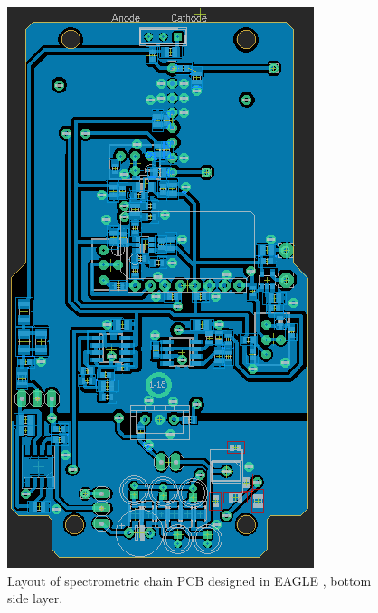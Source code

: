\begin{figure}[H]
 \centering
 \includegraphics[scale=0.8, angle = 90]{./pictures/S14bottomLay.png}
 \caption{Layout of spectrometric chain PCB designed in EAGLE \cite{eagle}, bottom side layer.}
 \label{layout bottom}
 
\end{figure}
\newpage





